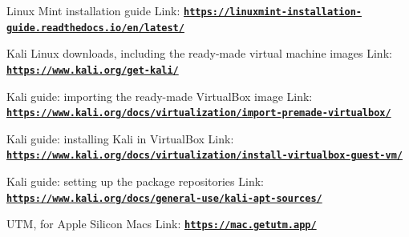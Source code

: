 \documentclass[12pt]{article}
\begin{document}
Linux Mint installation guide
Link: \href{https://linuxmint-installation-guide.readthedocs.io/en/latest/}{\textbf{\nolinkurl{https://linuxmint-installation-guide.readthedocs.io/en/latest/}}}

Kali Linux downloads, including the ready-made virtual machine images
Link: \href{https://www.kali.org/get-kali/}{\textbf{\nolinkurl{https://www.kali.org/get-kali/}}}

Kali guide: importing the ready-made VirtualBox image
Link: \href{https://www.kali.org/docs/virtualization/import-premade-virtualbox/}{\textbf{\nolinkurl{https://www.kali.org/docs/virtualization/import-premade-virtualbox/}}}

Kali guide: installing Kali in VirtualBox
Link: \href{https://www.kali.org/docs/virtualization/install-virtualbox-guest-vm/}{\textbf{\nolinkurl{https://www.kali.org/docs/virtualization/install-virtualbox-guest-vm/}}}

Kali guide: setting up the package repositories
Link: \href{https://www.kali.org/docs/general-use/kali-apt-sources/}{\textbf{\nolinkurl{https://www.kali.org/docs/general-use/kali-apt-sources/}}}

UTM, for Apple Silicon Macs
Link: \href{https://mac.getutm.app/}{\textbf{\nolinkurl{https://mac.getutm.app/}}}
\end{document}
